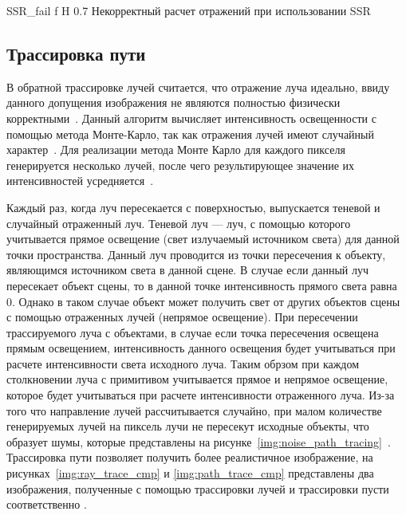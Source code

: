 {SSR_fail} %
{f} %
{H} %
{0.7\textwidth} %
{Некорректный расчет отражений при использовании SSR} %





\subsection{Трассировка пути}
В обратной трассировке лучей считается, что отражение луча идеально, ввиду данного допущения
изображения не являются полностью физически корректными~\cite{path_tracing}.
Данный алгоритм вычисляет интенсивность освещенности с помощью метода Монте-Карло, так как отражения лучей имеют случайный характер~\cite{monte_carlo}.
Для реализации метода Монте Карло  для каждого пикселя генерируется несколько  лучей,
после чего результирующее значение их интенсивностей усредняется~\cite{path_tracing_def}.

Каждый раз, когда луч пересекается с поверхностью, выпускается теневой и случайный отраженный луч.
Теневой луч --- луч, с помощью которого учитывается прямое освещение (свет излучаемый источником света) для данной точки пространства. Данный луч проводится из 
точки пересечения к объекту, являющимся источником света в данной сцене. В случае если данный луч пересекает объект сцены, то в данной точке интенсивность
прямого света равна 0. Однако в таком случае объект может получить свет от других объектов сцены с помощью отраженных лучей (непрямое освещение). При пересечении трассируемого луча
с объектами, в случае если  точка пересечения освещена прямым освещением, интенсивность данного освещения будет учитываться при расчете интенсивности света исходного луча.
Таким обрзом при каждом столкновении луча с примитивом учитывается прямое и непрямое освещение, которое будет учитываться при расчете интенсивности отраженного луча.
Из-за того что направление лучей рассчитывается случайно, при малом количестве генерируемых лучей на пиксель лучи не пересекут исходные объекты, что образует шумы, которые 
представлены на рисунке~\ref{img:noise_path_tracing}~\cite{path_tracing, ray_path_tracing}.
Трассировка пути позволяет получить более реалистичное изображение, на рисунках~\ref{img:ray_trace_cmp} и \ref{img:path_trace_cmp} представлены два изображения,
полученные с помощью трассировки лучей и трассировки пусти соответственно \cite{cyber_trce}.




